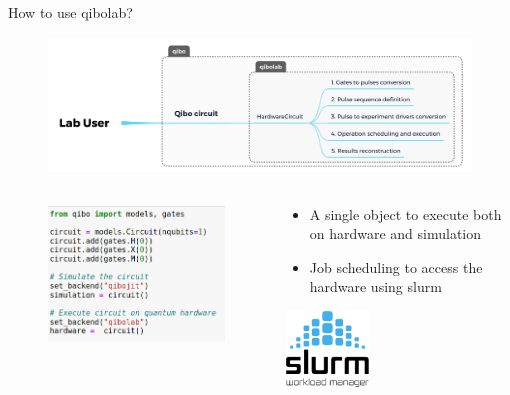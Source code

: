 \documentclass[11pt]{beamer}
\begin{document}
\begin{frame}{How to use qibolab?}
    \begin{figure}
        \includegraphics[width=\textwidth]{figures/hardwarecircuit.png}
    \end{figure}

    \begin{columns}
        \begin{column}{0.5 \textwidth}
            \begin{figure}
                \includegraphics[width = \columnwidth]{figures/qibo__circuit.png}
            \end{figure}
        \end{column}
        \begin{column}{0.5 \textwidth}
            \begin{itemize}
                \item A single object to execute both on hardware and simulation
                \item Job scheduling to access the hardware using slurm
            \end{itemize}
            \centering
            \includegraphics[height=2cm]{figures/Slurm_logo.svg.png}
        \end{column}
    \end{columns}

\end{frame}
\end{document}
